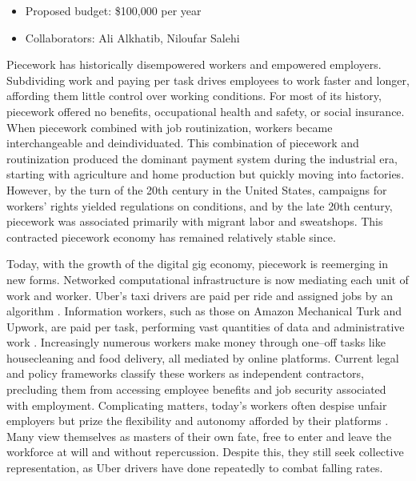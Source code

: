 \documentclass[11pt]{article}
\begin{document}
\begin{itemize}[leftmargin=0em,label={}]
\item Proposed budget: \$100,000 per year
\item Collaborators: Ali Alkhatib, Niloufar Salehi
\end{itemize}
\thispagestyle{empty}
\pagebreak
\clearpage
\setcounter{page}{1}

Piecework has historically disempowered workers and empowered employers.
Subdividing work and paying per task drives employees to work faster and longer, affording them little control over working conditions.
For most of its history, piecework offered no benefits, occupational health and safety, or social insurance.
When piecework combined with job routinization, workers became interchangeable and deindividuated.
This combination of piecework and routinization produced the dominant payment system during the industrial era,
starting with agriculture and home production but quickly moving into factories.
However, by the turn of the 20th century in the United States, campaigns for workers' rights yielded regulations on conditions, and by the late 20th century, piecework was associated primarily with migrant labor and sweatshops.
This contracted piecework economy has remained relatively stable since.

Today, with the growth of the digital gig economy, piecework is reemerging in new forms.
Networked computational infrastructure is now mediating each unit of work and worker.
Uber's taxi drivers are paid per ride and assigned jobs by an algorithm
\cite{uberAlgorithm,hall2015analysis}.
Information workers, such as those on Amazon Mechanical Turk and Upwork, are paid per task, performing vast quantities of data and administrative work
\cite{martin2014being}.
Increasingly numerous workers make money through one--off tasks like housecleaning and food delivery, all mediated by online platforms.
Current legal and policy frameworks classify these workers as independent contractors, precluding them from accessing employee benefits and job security associated with employment.
Complicating matters, today's workers often despise unfair employers but prize the flexibility and autonomy afforded by their platforms
\cite{martin2014being}.
Many view themselves as masters of their own fate, free to enter and leave the workforce at will and without repercussion.
Despite this, they still seek collective representation, as Uber drivers have done repeatedly to combat falling rates.
\end{document}
